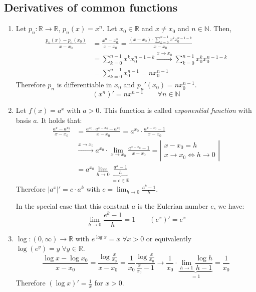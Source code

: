 \documentclass[a4paper,landscape,twocolumn]{article}
\theoremstyle{definition}
\newcommand\abs[1]{\left|#1\right|}
\begin{document}
\subsection{Derivatives of common functions}
%
\begin{enumerate}
  \item
    Let $p_n: \mathbb R \to \mathbb R$, $p_n(x) = x^n$. Let $x_0 \in \mathbb R$ and $x \neq x_0$ and $n \in \mathbb N$.
    Then,
    \begin{align*}
      \frac{p_n(x) - p_n(x_0)}{x - x_0}
        &= \frac{x^n - x_0^n}{x - x_0}
         = \frac{(x - x_0) \cdot \sum_{k=0}^{n - 1} x^k x_0^{n-1-k}}{x - x_0} \\
        &= \sum_{k=0}^{n-1} x^k x_0^{n-1-k}
         \xrightarrow{x \to x_0} \sum_{k=0}^{n-1} x_0^k x_0^{n-1-k} \\
        &= \sum_{k=0}^{n-1} x_0^{n-1}
         = n x_0^{n-1}
    \end{align*}
    Therefore $p_n$ is differentiable in $x_0$ and $p_n'(x_0) = n x_0^{n-1}$.
    \[ (x^n)' = nx^{n-1} \qquad \forall n \in \mathbb N \]

  \item Let $f(x) = a^x$ with $a > 0$. This function is called
    \emph{exponential function} with basis $a$. It holds that:
    \begin{align*}
      \frac{a^x - a^{x_0}}{x - x_0}
        &= \frac{a^{x_0} \cdot a^{x - x_0} - a^{x_0}}{x - x_0}
         = a^{x_0} \cdot \frac{a^{x - x_0} - 1}{x - x_0} \\
        &\xrightarrow{x \to x_0} a^{x_0} \cdot \lim_{x \to x_0} \frac{a^{x - x_0} - 1}{x - x_0}
         = \abs{
          \begin{array}{c}
            x - x_0 = h \\
            x \to x_0 \iff h \to 0
          \end{array}
        } \\
        &= a^{x_0} \lim_{h \to 0} \underbrace{\frac{a^h - 1}{h}}_{= c \in \mathbb R}
    \end{align*}
    Therefore $\abs{a^x}' = c \cdot a^k$ with $c = \lim_{h\to 0} \frac{a^k - 1}{h}$.

    In the special case that this constant $a$ is the Eulerian number $e$, we have:
    \[ \lim_{h\to0} \frac{e^k - 1}{h} = 1 \qquad (e^x)' = e^x \]
  \item $\log: (0, \infty) \to \mathbb R$ with $e^{\log{x}} = x \;\forall x > 0$
    or equivalently $\log(e^y) = y \;\forall y \in \mathbb R$.
    \[
      \frac{\log{x} - \log{x_0}}{x - x_0}
      = \frac{\log\frac x{x_0}}{x - x_0}
      = \frac1{x_0} \frac{\log{\frac{x}{x_0}}}{\frac x{x_0} - 1}
      \to \frac1{x_0} \cdot \underbrace{\lim_{h\to1} \frac{\log{h}}{h - 1}}_{= 1} = \frac1{x_0}
    \]
    Therefore $(\log{x})' = \frac1x$ for $x > 0$.
\end{enumerate}
\end{document}
